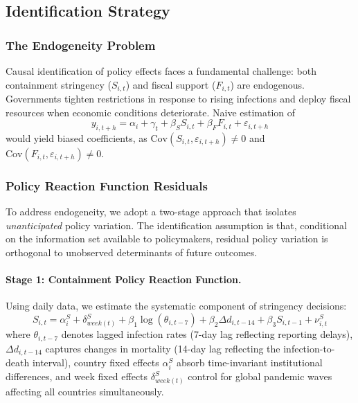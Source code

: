 \documentclass[12pt, a4paper]{article}
\begin{document}
\subsection{Identification Strategy}

\subsubsection{The Endogeneity Problem}

Causal identification of policy effects faces a fundamental challenge: both containment stringency ($S_{i,t}$) and fiscal support ($F_{i,t}$) are endogenous. Governments tighten restrictions in response to rising infections and deploy fiscal resources when economic conditions deteriorate. Naive estimation of
\begin{equation}
    y_{i,t+h} = \alpha_i + \gamma_t + \beta_S S_{i,t} + \beta_F F_{i,t} + \varepsilon_{i,t+h}
\end{equation}
would yield biased coefficients, as $\text{Cov}(S_{i,t}, \varepsilon_{i,t+h}) \neq 0$ and $\text{Cov}(F_{i,t}, \varepsilon_{i,t+h}) \neq 0$.

\subsubsection{Policy Reaction Function Residuals}

To address endogeneity, we adopt a two-stage approach that isolates \textit{unanticipated} policy variation. The identification assumption is that, conditional on the information set available to policymakers, residual policy variation is orthogonal to unobserved determinants of future outcomes.

\paragraph{Stage 1: Containment Policy Reaction Function.} Using daily data, we estimate the systematic component of stringency decisions:
\begin{equation}
    S_{i,t} = \alpha^S_i + \delta^S_{week(t)} + \beta_1 \log(\theta_{i,t-7}) + \beta_2 \Delta d_{i,t-14} + \beta_3 S_{i,t-1} + \nu^S_{i,t}
    \label{eq:reaction_S}
\end{equation}
where $\theta_{i,t-7}$ denotes lagged infection rates (7-day lag reflecting reporting delays), $\Delta d_{i,t-14}$ captures changes in mortality (14-day lag reflecting the infection-to-death interval), country fixed effects $\alpha^S_i$ absorb time-invariant institutional differences, and week fixed effects $\delta^S_{week(t)}$ control for global pandemic waves affecting all countries simultaneously.
\end{document}
